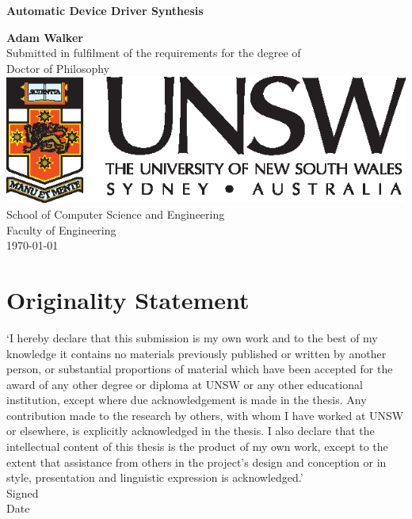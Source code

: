 \documentclass[a4paper,twoside,openright,11pt,oldfontcommands]{memoir}
\theoremstyle{definition}
\begin{document}
\nobibliography*

\frontmatter

\thispagestyle{empty}
\mbox{}
\vfill
\begin{center}
    {\Huge\sffamily\bfseries Automatic Device Driver Synthesis\\[2cm]\par}
{\Large\sffamily\bfseries Adam Walker}\\[2cm]
Submitted in fulfilment of the requirements for the degree of \\
Doctor of Philosophy\\[1cm]
\includegraphics{imgs/unsw} \\[1cm]
School of Computer Science and Engineering \\[0.5cm]
Faculty of Engineering \\[2cm]
\monthyear\today
\end{center}
\par
\vfill
\clearpage

\thispagestyle{plain}
\section*{Originality Statement}

`I hereby declare that this submission is my own work and to the best of my
knowledge it contains no materials previously published or written by another
person, or substantial proportions of material which have been accepted for
the award of any other degree or diploma at UNSW or any other educational
institution, except where due acknowledgement is made in the thesis. Any
contribution made to the research by others, with whom I have worked at UNSW
or elsewhere, is explicitly acknowledged in the thesis.  I also declare that
the intellectual content of this thesis is the product of my own work, except
to the extent that assistance from others in the project's design and
conception or in style, presentation and linguistic expression is
acknowledged.'\\[0.5cm]
Signed\hspace{0.5cm}\dotfill\hfill\\[0.5cm]
Date\hspace{0.5cm}\dotfill\hfill\\
\vfil\newpage
\end{document}
